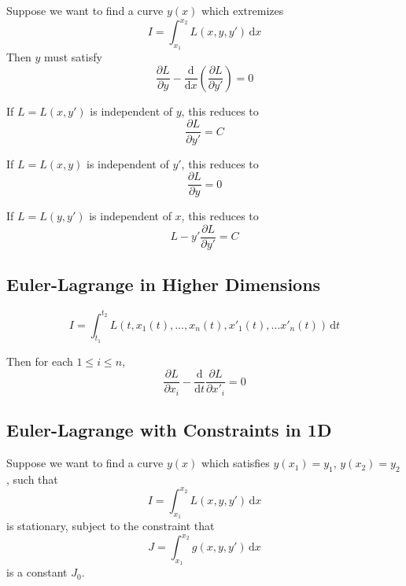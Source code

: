 \documentclass{article}
\theoremstyle{definition}
\theoremstyle{definition}
\theoremstyle{remark}
\begin{document}
Suppose we want to find a curve $y(x)$ which extremizes
\begin{equation*}
    I = \int_{x_1}^{x_2} L(x, y, y') \,\mathrm{d}x
\end{equation*}
Then $y$ must satisfy
\begin{equation*}
    \frac{\partial L}{\partial y} - \frac{\mathrm{d}}{\mathrm{d}x} \left( \frac{\partial L}{\partial y'} \right) = 0
\end{equation*}

\noindent If $L=L(x, y')$ is independent of $y$, this reduces to
\begin{equation*}
    \frac{\partial L}{\partial y'} = C
\end{equation*}

\noindent If $L=L(x, y)$ is independent of $y'$, this reduces to
\begin{equation*}
    \frac{\partial L}{\partial y} = 0
\end{equation*}

\noindent If $L=L(y, y')$ is independent of $x$, this reduces to
\begin{equation*}
    L - y' \frac{\partial L}{\partial y'} = C
\end{equation*}

\subsection{Euler-Lagrange in Higher Dimensions}

\begin{equation*}
    I = \int_{t_1}^{t_2} L(t, x_1(t), \ldots, x_n(t), x'_1(t), \ldots x'_n(t)) \,\mathrm{d}t
\end{equation*}

Then for each $1 \le i \le n$,
\begin{equation*}
    \frac{\partial L}{\partial x_i} - \frac{\mathrm{d}}{\mathrm{d}t} \frac{\partial L}{\partial x'_i} = 0
\end{equation*}

\subsection{Euler-Lagrange with Constraints in 1D}

Suppose we want to find a curve $y(x)$ which satisfies $y(x_1) = y_1$, $y(x_2) = y_2$, such that
\begin{equation*}
    I = \int_{x_1}^{x_2} L(x, y, y') \,\mathrm{d}x
\end{equation*}
is stationary, subject to the constraint that
\begin{equation*}
    J = \int_{x_1}^{x_2} g(x, y, y') \,\mathrm{d}x
\end{equation*}
is a constant $J_0$.
\end{document}
